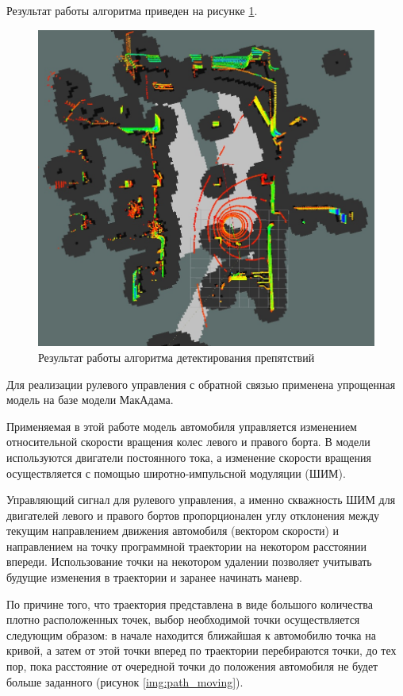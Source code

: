 Результат работы алгоритма приведен на рисунке \ref{img:obstacles_lidar}.

\begin{figure}[h]
    \centering
    \includegraphics[width=\linewidth]{images/3_devel/obstacles_lidar}
    \caption{Результат работы алгоритма детектирования препятствий}
    \label{img:obstacles_lidar}
\end{figure}

Для реализации рулевого управления с обратной связью применена упрощенная модель на базе
модели МакАдама.

Применяемая в этой работе модель автомобиля управляется изменением относительной скорости вращения
колес левого и правого борта. В модели используются двигатели постоянного тока, а изменение
скорости вращения осуществляется с помощью широтно-импульсной модуляции (ШИМ). 

Управляющий сигнал для рулевого управления, а именно скважность ШИМ для двигателей левого и правого
бортов пропорционален углу отклонения между текущим направлением движения автомобиля (вектором скорости)
и направлением на точку программной траектории на некотором расстоянии впереди. Использование точки на
некотором удалении позволяет учитывать будущие изменения в траектории и заранее начинать маневр.

По причине того, что траектория представлена в виде большого количества плотно расположенных
точек, выбор необходимой точки осуществляется следующим образом: в начале находится ближайшая к автомобилю
точка на кривой, а затем от этой точки вперед по траектории перебираются точки, до тех пор, пока
расстояние от очередной точки до положения автомобиля не будет больше заданного (рисунок \ref{img:path_moving}).

